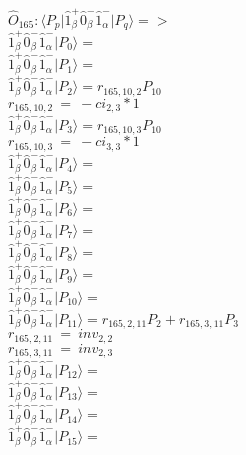 \documentclass[14pt]{article}
\begin{document}
    $\hat{O}_{165}:  \langle{P_p}\vert \hat{1}_{\beta}^{+}\hat{0}_{\beta}^{-}\hat{1}_{\alpha}^{-} \vert{P_q}\rangle => $ \\ 
    $ \hat{1}_{\beta}^{+}\hat{0}_{\beta}^{-}\hat{1}_{\alpha}^{-} \vert{P_{0}}\rangle =  $ \\ 
    $ \hat{1}_{\beta}^{+}\hat{0}_{\beta}^{-}\hat{1}_{\alpha}^{-} \vert{P_{1}}\rangle =  $ \\ 
    $ \hat{1}_{\beta}^{+}\hat{0}_{\beta}^{-}\hat{1}_{\alpha}^{-} \vert{P_{2}}\rangle = {r}_{165,10,2}P_{10} $ \\ 
    ${r}_{165,10,2}\ =\ -{ci}_{2,3}*1 $ \\ 
    $ \hat{1}_{\beta}^{+}\hat{0}_{\beta}^{-}\hat{1}_{\alpha}^{-} \vert{P_{3}}\rangle = {r}_{165,10,3}P_{10} $ \\ 
    ${r}_{165,10,3}\ =\ -{ci}_{3,3}*1 $ \\ 
    $ \hat{1}_{\beta}^{+}\hat{0}_{\beta}^{-}\hat{1}_{\alpha}^{-} \vert{P_{4}}\rangle =  $ \\ 
    $ \hat{1}_{\beta}^{+}\hat{0}_{\beta}^{-}\hat{1}_{\alpha}^{-} \vert{P_{5}}\rangle =  $ \\ 
    $ \hat{1}_{\beta}^{+}\hat{0}_{\beta}^{-}\hat{1}_{\alpha}^{-} \vert{P_{6}}\rangle =  $ \\ 
    $ \hat{1}_{\beta}^{+}\hat{0}_{\beta}^{-}\hat{1}_{\alpha}^{-} \vert{P_{7}}\rangle =  $ \\ 
    $ \hat{1}_{\beta}^{+}\hat{0}_{\beta}^{-}\hat{1}_{\alpha}^{-} \vert{P_{8}}\rangle =  $ \\ 
    $ \hat{1}_{\beta}^{+}\hat{0}_{\beta}^{-}\hat{1}_{\alpha}^{-} \vert{P_{9}}\rangle =  $ \\ 
    $ \hat{1}_{\beta}^{+}\hat{0}_{\beta}^{-}\hat{1}_{\alpha}^{-} \vert{P_{10}}\rangle =  $ \\ 
    $ \hat{1}_{\beta}^{+}\hat{0}_{\beta}^{-}\hat{1}_{\alpha}^{-} \vert{P_{11}}\rangle = {r}_{165,2,11}P_{2}+{r}_{165,3,11}P_{3} $ \\ 
    ${r}_{165,2,11}\ =\ {inv}_{2,2} $ \\ 
    ${r}_{165,3,11}\ =\ {inv}_{2,3} $ \\ 
    $ \hat{1}_{\beta}^{+}\hat{0}_{\beta}^{-}\hat{1}_{\alpha}^{-} \vert{P_{12}}\rangle =  $ \\ 
    $ \hat{1}_{\beta}^{+}\hat{0}_{\beta}^{-}\hat{1}_{\alpha}^{-} \vert{P_{13}}\rangle =  $ \\ 
    $ \hat{1}_{\beta}^{+}\hat{0}_{\beta}^{-}\hat{1}_{\alpha}^{-} \vert{P_{14}}\rangle =  $ \\ 
    $ \hat{1}_{\beta}^{+}\hat{0}_{\beta}^{-}\hat{1}_{\alpha}^{-} \vert{P_{15}}\rangle =  $ \\ 
    
\end{document}
